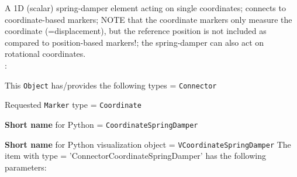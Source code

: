 \ei

%
\newpage


\label{sec:item:ObjectConnectorCoordinateSpringDamper}
A 1D (scalar) spring-damper element acting on single  coordinates; connects to coordinate-based markers; NOTE that the coordinate markers only measure the coordinate (=displacement), but the reference position is not included as compared to position-based markers!; the spring-damper can also act on rotational coordinates.
\vspace{12pt}\\

\noindent {}:
\bi
  \item This \texttt{Object} has/provides the following types = \texttt{Connector}
  \item Requested \texttt{Marker} type = \texttt{Coordinate}
  \item {\bf Short name} for Python = \texttt{CoordinateSpringDamper}
  \item {\bf Short name} for Python visualization object = \texttt{VCoordinateSpringDamper}
\ei\vspace{12pt} \noindent 
The item  with type = 'ConnectorCoordinateSpringDamper' has the following parameters:
\vspace{-0.5cm}\\
\vspace{-0.5cm}\\
